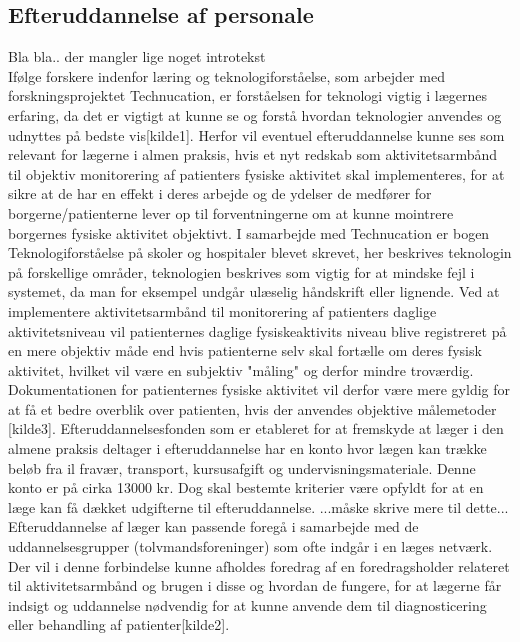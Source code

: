  
\subsection{Efteruddannelse af personale}
Bla bla.. der mangler lige noget introtekst\\

Ifølge forskere indenfor læring og teknologiforståelse, som arbejder med forskningsprojektet Technucation, er forståelsen for teknologi vigtig i lægernes erfaring, da det er vigtigt at kunne se og forstå hvordan teknologier anvendes og udnyttes på bedste vis[kilde1]. Herfor vil eventuel efteruddannelse kunne ses som relevant for lægerne i almen praksis, hvis et nyt redskab som aktivitetsarmbånd til objektiv monitorering af patienters fysiske aktivitet skal implementeres, for at sikre at de har en effekt i deres arbejde og de ydelser de medfører for borgerne/patienterne lever op til forventningerne om at kunne mointrere borgernes fysiske aktivitet objektivt. I samarbejde med Technucation er bogen Teknologiforståelse på skoler og hospitaler blevet skrevet, her beskrives teknologin på forskellige områder, teknologien beskrives som vigtig for at mindske fejl i systemet, da man for eksempel undgår ulæselig håndskrift eller lignende. Ved at implementere aktivitetsarmbånd til monitorering af patienters daglige aktivitetsniveau vil patienternes daglige fysiskeaktivits niveau blive registreret på en mere objektiv måde end hvis patienterne selv skal fortælle om deres fysisk aktivitet, hvilket vil være en subjektiv "måling" og derfor mindre troværdig. Dokumentationen for patienternes fysiske aktivitet vil derfor være mere gyldig for at få et bedre overblik over patienten, hvis der anvendes objektive målemetoder [kilde3]. 
Efteruddannelsesfonden som er etableret for at fremskyde at læger i den almene praksis deltager i efteruddannelse har en konto hvor lægen kan trække beløb fra il fravær, transport, kursusafgift og undervisningsmateriale. Denne konto er på cirka 13000 kr. Dog skal bestemte kriterier være opfyldt for at en læge kan få dækket udgifterne til efteruddannelse. ...måske skrive  mere til dette... Efteruddannelse af læger kan passende foregå i samarbejde med de uddannelsesgrupper (tolvmandsforeninger) som ofte indgår i en læges netværk. Der vil i denne forbindelse kunne afholdes foredrag af en foredragsholder relateret til aktivitetsarmbånd og brugen i disse og hvordan de fungere, for at lægerne får indsigt og uddannelse nødvendig for at kunne anvende dem til diagnosticering eller behandling af patienter[kilde2]. 
\\
